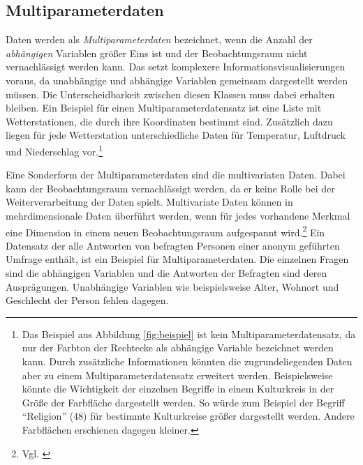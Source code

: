 \documentclass[a4paper, 
               12pt,
               DIV=calc,
               version=first,
               pdftex,
               headsepline,
               footsepline,
               bibtotocnumbered,
               liststotocnumbered]{scrreprt}
\begin{document}
\subsection{Multiparameterdaten}
Daten werden als \textit{Multiparameterdaten} bezeichnet, wenn die Anzahl der \textit{abhängigen} Variablen größer Eins ist
und der Beobachtungsraum nicht vernachlässigt werden kann. Das setzt komplexere
Informationsvisualisierungen voraus, da unabhängige und abhängige Variablen gemeinsam
dargestellt werden müssen. Die Unterscheidbarkeit zwischen diesen Klassen muss dabei
erhalten bleiben.
Ein Beispiel für einen Multiparameterdatensatz ist eine Liste mit Wetterstationen, die durch ihre
Koordinaten bestimmt sind. Zusätzlich dazu liegen für jede Wetterstation unterschiedliche
Daten für Temperatur, Luftdruck und Niederschlag vor.\footnote{Das Beispiel aus Abbildung
\ref{fig:beispiel} ist kein Multiparameterdatensatz, da nur der Farbton der Rechtecke als
abhängige Variable bezeichnet werden kann. Durch zusätzliche Informationen könnten die
zugrundeliegenden Daten aber zu einem Multiparameterdatensatz erweitert werden. Beispielsweise
könnte die Wichtigkeit der einzelnen Begriffe in einem Kulturkreis in der Größe der
Farbfläche dargestellt werden. So würde zum Beispiel der Begriff "`Religion"' (48) für
bestimmte Kulturkreise größer dargestellt werden. Andere Farbflächen erschienen dagegen
kleiner.}

Eine Sonderform der Multiparameterdaten sind die multivariaten Daten. Dabei kann
der Beobachtungsraum vernachlässigt werden, da er keine Rolle bei der Weiterverarbeitung
der Daten spielt. Multivariate Daten können in mehrdimensionale Daten überführt werden,
wenn für jedes vorhandene Merkmal eine Dimension in einem neuen Beobachtungsraum
aufgespannt wird.\footnote{Vgl. \citep[S.\,172]{Schumann}} Ein Datensatz der alle
Antworten von befragten Personen einer anonym geführten Umfrage enthält, ist ein Beispiel
für Multiparameterdaten. Die einzelnen Fragen sind die abhängigen Variablen und
die Antworten der Befragten sind deren Ausprägungen. Unabhängige Variablen wie beispielsweise
Alter, Wohnort und Geschlecht der Person fehlen dagegen.
\end{document}
